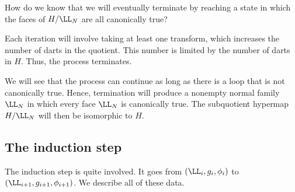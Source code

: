How do we know that we will eventually terminate by reaching
a state in which the faces of $H/\LL_N$ are all canonically true?

Each iteration will involve taking at least one transform, which
increases the number of darts in the quotient.  This number is
limited by the number of darts in $H$.  Thus, the process terminates.

We will see that the process can continue as long as there is a 
loop that is not canonically true.  Hence, termination will produce
a nonempty normal family $\LL_N$ in which every face $\LL_N$ is 
canonically true.  The subquotient hypermap $H/\LL_N$
will then be isomorphic to $H$.











\subsection{The induction step}

The induction step is quite involved.  It goes from
$(\LL_i,g_i,\phi_i)$ to $(\LL_{i+1},g_{i+1},\phi_{i+1})$.
We describe all of these data.

